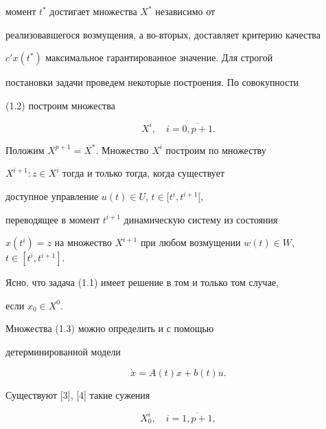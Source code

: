 момент $t^*$ достигает множества $X^*$  независимо от


реализовавшегося возмущения, а во-вторых, доставляет критерию качества


$c'x(t^*)$ максимальное гарантированное значение. Для строгой


постановки задачи проведем некоторые построения. По совокупности


(1.2) построим множества


\begin{equation}


X^i,\quad i=\overline{0,p+1}.


\end{equation}





Положим $X^{p+1}=X^*$.  Множество $X^i$  построим по множеству


$X^{i+1}:z \in X^i$ тогда и только тогда, когда существует


доступное управление $u(t) \in U$, $t \in [t^i, t^{i+1}[$,


переводящее в момент $t^{i+1}$ динамическую систему из состояния


$x(t^i)=z$ на множество $X^{i+1}$ при любом возмущении $w(t) \in


W$, $t \in [t^i, t^{i+1}]$.





Ясно, что задача (1.1) имеет решение в том и только том случае,


если $x_0 \in X^0$.





\begin{notes} Множества (1.3) можно определить и с помощью


детерминированной модели


\begin{equation}


\Dot x =A(t)x+b(t)u.


\end{equation}


\end{notes}





Существуют [3], [4] такие сужения


\begin{equation}


X_0^i,\quad i=\overline{1,p+1},


\end{equation}



